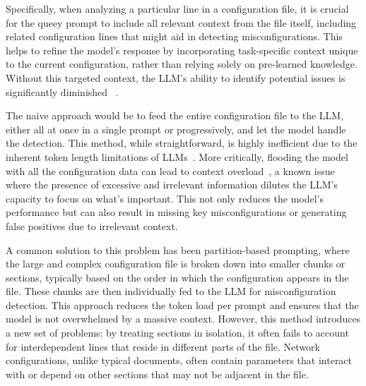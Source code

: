 Specifically, when analyzing a particular line in a configuration file, it is crucial for the queey prompt to include all relevant context from the file itself, including related configuration lines that might aid in detecting misconfigurations. This helps to refine the model's response by incorporating task-specific context unique to the current configuration, rather than relying solely on pre-learned knowledge. Without this targeted context, the LLM's ability to identify potential issues is significantly diminished ~\cite{liskavets2024prompt,tian2024examining,khurana2024and, shvartzshnaider2024llm}.

The naive approach would be to feed the entire configuration file to the LLM, either all at once in a single prompt or progressively, and let the model handle the detection. This method, while straightforward, is highly inefficient due to the inherent token length limitations of LLMs~\cite{xue2024repeat,yu2024breaking,gu2023mamba}. More critically, flooding the model with all the configuration data can lead to context overload~\cite{lican,li2024long,qian2024long}, a known issue where the presence of excessive and irrelevant information dilutes the LLM’s capacity to focus on what’s important. This not only reduces the model’s performance but can also result in missing key misconfigurations or generating false positives due to irrelevant context. 

A common solution to this problem has been partition-based prompting, where the large and complex configuration file is broken down into smaller chunks or sections, typically based on the order in which the configuration appears in the file. These chunks are then individually fed to the LLM for misconfiguration detection. This approach reduces the token load per prompt and ensures that the model is not overwhelmed by a massive context. However, this method introduces a new set of problems: by treating sections in isolation, it often fails to account for interdependent lines that reside in different parts of the file. Network configurations, unlike typical documents, often contain parameters that interact with or depend on other sections that may not be adjacent in the file.

